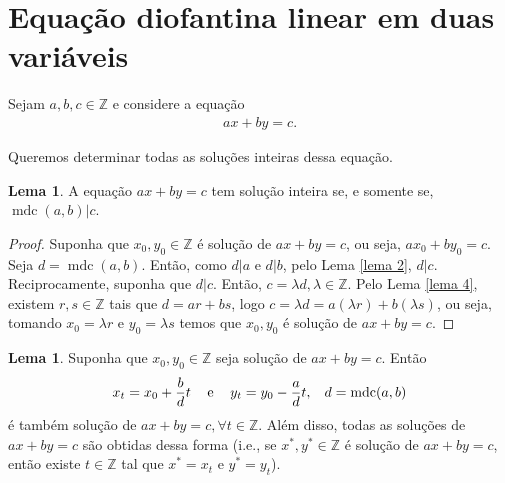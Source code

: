 \documentclass[a4paper,11pt,twoside, leqno]{article}
\DeclareMathOperator{\mdc}{mdc}
\theoremstyle{definition}
\newtheorem{lemma}[theorem]{Lema}
\begin{document}
\section{Equação diofantina linear em duas variáveis}
\hspace{12pt} Sejam $a,b,c\in\mathbb{Z}$ e considere a equação
\begin{align*}
ax + by = c.
\end{align*}
\par Queremos determinar todas as soluções inteiras dessa equação.
\begin{lemma}
	\label{lema 7}
	A equação $ax + by = c$ tem solução inteira se, e somente se, $\mdc(a,b)|c$. 
\end{lemma}
\begin{proof}
	Suponha que $x_0, y_0\in\mathbb{Z}$ é solução de $ax + by = c$, ou seja, $ax_0 + by_0 = c$. Seja $d = \mdc(a,b)$. Então, como $d|a$ e $d|b$, pelo Lema \eqref{lema 2}, $d|c$. Reciprocamente, suponha que $d|c$. Então, $c = \lambda d, \lambda\in\mathbb{Z}$. Pelo Lema \eqref{lema 4}, existem $r,s\in\mathbb{Z}$ tais que $d = ar + bs$, logo $c = \lambda d = a(\lambda r) + b(\lambda s)$, ou seja, tomando $x_0 = \lambda r$ e $y_0 = \lambda s$ temos que $x_0, y_0$ é solução de $ax + by = c$.
\end{proof}
\begin{lemma}
	\label{lema 8}
	Suponha que $x_0,y_0\in\mathbb{Z}$ seja solução de $ax + by = c$. Então
	\begin{align*}
	x_t = x_0 + \frac{b}{d}t \hspace{0.3cm} \text{ e } \hspace{0.3cm} y_t = y_0 - \frac{a}{d}t, \hspace{0.3cm} d = \mdc(a,b)
	\end{align*}
	é também solução de $ax + by = c, \forall t\in\mathbb{Z}$. Além disso, todas as soluções de $ax + by = c$ são obtidas dessa forma (i.e., se $x^\ast, y^\ast\in\mathbb{Z}$ é solução de $ax + by = c$, então existe $t\in\mathbb{Z}$ tal que $x^\ast = x_t$ e $y^\ast = y_t$).
\end{lemma}
\end{document}
